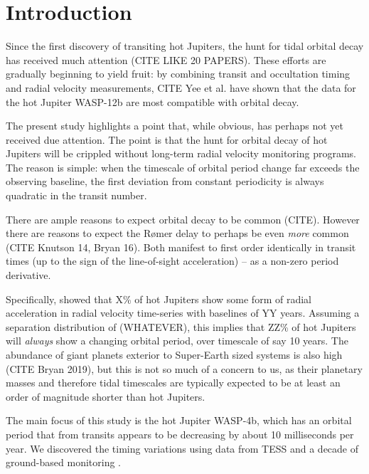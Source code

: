 \documentclass[12pt,twocolumn,tighten]{aastex62}
\begin{document}


\section{Introduction}

Since the first discovery of transiting hot Jupiters, the hunt for
tidal orbital decay has received much attention (CITE LIKE 20 PAPERS).
These efforts are gradually beginning to yield fruit: by combining
transit and occultation timing and radial velocity measurements, CITE
Yee et al{.} have shown that the data for the hot Jupiter WASP-12b are
most compatible with orbital decay.

The present study highlights a point that, while obvious, has perhaps
not yet received due attention.  The point is that the hunt for
orbital decay of hot Jupiters will be crippled without long-term
radial velocity monitoring programs.  The reason is simple: when the
timescale of orbital period change far exceeds the observing baseline,
the first deviation from constant periodicity is always quadratic in
the transit number.

There are ample reasons to expect orbital decay to be common (CITE).
However there are reasons to expect the R{\o}mer delay to perhaps be
even {\it more} common (CITE Knutson 14, Bryan 16).  Both manifest to
first order identically in transit times (up to the sign of the
line-of-sight acceleration) -- as a non-zero period derivative.

Specifically, \citet{knutson_friends_2014} showed that X\% of hot
Jupiters show some form of radial acceleration in radial velocity
time-series with baselines of YY years.  Assuming a separation
distribution of (WHATEVER), this implies that ZZ\% of hot Jupiters
will {\it always} show a changing orbital period, over timescale of
say 10 years.
The abundance of giant planets
exterior to Super-Earth sized systems is also high (CITE Bryan 2019),
but this is not so much of a concern to us, as their planetary masses
and therefore tidal timescales are typically expected to be at least
an order of magnitude shorter than hot Jupiters.

The main focus of this study is the hot Jupiter WASP-4b, which has an
orbital period that from transits appears to be decreasing by about 10
milliseconds per year.  We discovered the timing variations using
data from TESS and a decade of ground-based monitoring
\citep[][hereafter ]{bouma_wasp4b_2019}.
\end{document}
